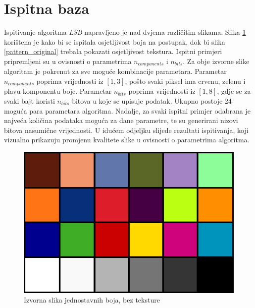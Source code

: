 \documentclass[times, utf8, seminar]{fer}
\begin{document}
\section{Ispitna baza}
Ispitivanje algoritma \textit{LSB} napravljeno je nad dvjema različitim slikama. Slika \ref{chart_original} korištena je kako bi se ispitala osjetljivost boja na postupak, dok bi slika \ref{pattern_original} trebala pokazati osjetljivost tekstura. Ispitni primjeri pripremljeni su u ovisnosti o parametrima $n_{components}$ i $n_{bits}$. Za obje izvorne slike algoritam je pokrenut za sve moguće kombinacije parametara. Parametar $n_{components}$ poprima vrijednosti iz $[1,3]$, pošto svaki piksel ima crvenu, zelenu i plavu komponentu boje. Parametar $n_{bits}$ poprima vrijednosti iz $[1,8]$, gdje se za svaki bajt koristi $n_{bits}$ bitova u koje se upisuje podatak. Ukupno postoje 24 moguća para parametara algoritma. Nadalje, za svaki ispitni primjer odabrana je najveća količina podataka moguća za dane parametre, te su generirani nizovi bitova nasumične vrijednosti. U idućem odjeljku slijede rezultati ispitivanja, koji vizualno prikazuju promjenu kvalitete slike u ovisnosti o parametrima algoritma.
\begin{center}
\begin{figure}[ht]
	\caption{Izvorna slika jednostavnih boja, bez teksture}
	\label{chart_original}
	\centerline{
	\includegraphics[scale=0.4]{../benchmark_results/color_chart/original.png}	
	}
\end{figure}
\end{center}
\end{document}
